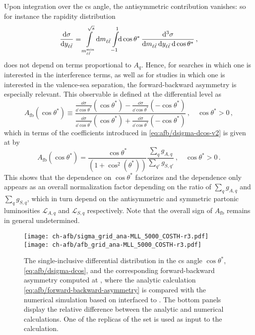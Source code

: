 Upon integration over the \acrlong{cs} angle, the
antisymmetric contribution vanishes: so for instance the
rapidity distribution
\begin{equation}
  \label{eq:afb/dsigma-dyll}
  \frac{\dd\sigma}{\dd y_{\ell\bar{\ell}}} = \int\limits_{m_{\ell\bar{\ell}}^{\text{min}}}^{\sqrt s}\!\dd m_{\ell\bar{\ell}} \int\limits_{-1}^{1}\!\!\dd\cos\theta^*\, \frac{\dd^3 \sigma}{\dd m_{\ell\bar{\ell}} \, \dd y_{\ell\bar{\ell}} \, \dd\cos\theta^*} \, ,
\end{equation}
does not depend on terms proportional to $A_q$.
%
Hence, for \bsm searches in which one is
interested in the interference terms, as well as for \pdf studies in which one is
interested in the valence-sea separation, the forward-backward
asymmetry is especially relevant.
%
This observable is
defined at the differential level as
\begin{equation}
  A_{\text{fb}}(\cos\theta^*) \equiv \frac{ \frac{\dd\sigma}{\dd\cos\theta^*}(\cos\theta^*)
  - \frac{\dd\sigma}{\dd\cos\theta^*}(-\cos\theta^*)}{ \frac{\dd\sigma}{\dd\cos\theta^*}(\cos\theta^*)
  + \frac{\dd\sigma}{\dd\cos\theta^*}(-\cos\theta^*) } \, ,\quad \cos\theta^*>0 \, ,
  \label{eq:afb/forward-backward-asymmetry}
\end{equation}
which in terms of the coefficients introduced in
\cref{eq:afb/dsigma-dcos-v2} is given at \lo by
\begin{equation}
  \label{eq:afb/afb_lo}
  A_{\text{fb}}(\cos\theta^*)   = \frac{\cos\theta^*}{(1+\cos^2(\theta^*))}\frac{\sum_q g_{A,q} }{\sum_{q'} g_{S,q'}} \, ,\quad \cos\theta^*>0 \,.
\end{equation}
This  shows that the dependence on $\cos\theta^*$ factorizes
and the \pdf dependence only appears as an overall normalization factor
depending on the ratio of $\sum_q g_{A,q}$
and $\sum_q g_{S,q}$, which in turn depend on the antisymmetric and symmetric
partonic luminosities $ \mathcal{L}_{A,q}$ and $ \mathcal{L}_{S,q}$ respectively.
%
Note that the overall sign of $A_{\text{fb}}$ remains in general undetermined.

\begin{figure}[t]
  \centering
  \texttt{[image: ch-afb/sigma\_grid\_ana-MLL\_5000\_COSTH-r3.pdf]}
  \texttt{[image: ch-afb/afb\_grid\_ana-MLL\_5000\_COSTH-r3.pdf]}
  \caption{The single-inclusive differential distribution in
    the \acrlong{cs} angle $\cos\theta^*$,
    \cref{eq:afb/dsigma-dcos},
    and the corresponding forward-backward asymmetry computed at \lo,
    where the analytic calculation  \cref{eq:afb/forward-backward-asymmetry}
    is compared with the numerical simulation based on 
    \mgamc
    interfaced to \pineappl.
    The bottom panels display the relative difference between the analytic and
    numerical calculations.
    One of the replicas of the  \nnlo \pdf set is used as input
    to the calculation.
  }    
  \label{fig:afb/lo-diff-cos}
\end{figure}

